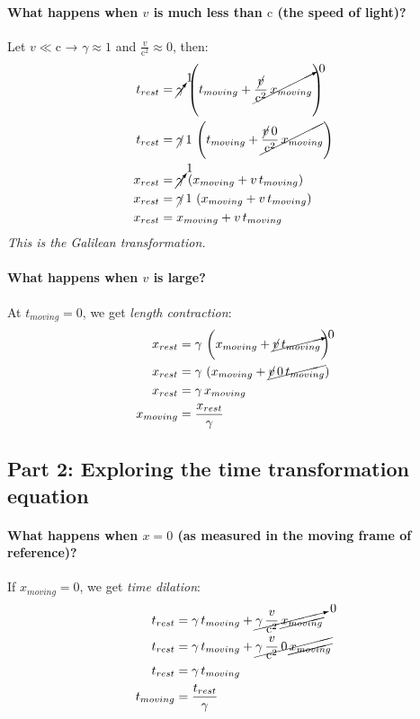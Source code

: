 \documentclass[pagesize,headsepline,10pt,parskip=half]{scrreprt}
\newcommand{\const}[1]{\ensuremath{\mathrm{#1}}}
\renewcommand{\c}{\const{c}}
\begin{document}
        \paragraph{What happens when $v$ is much less than \c{} (the speed of light)?}
          Let $v \ll \c$ → $\gamma \approx 1$ and $\frac{v}{\c^2} \approx 0$, then:
          \begin{align*}
            t_{rest} &= \cancelto{1}{\gamma} \, \left(t_{moving} + \cancelto{0}{\frac{\cancel{v}}{\c^2} \, x_{moving}}\right)\\
            t_{rest} &= \cancel{\gamma} \, 1 \, \left(t_{moving} + \cancel{\frac{\cancel{v} \, 0}{\c^2} \, x_{moving}}\right)\\
            x_{rest} &= \cancelto{1}{\gamma} \, \left(x_{moving} + v \, t_{moving}\right)\\
            x_{rest} &= \cancel{\gamma} \, 1 \, \left(x_{moving} + v \, t_{moving}\right)\\
            x_{rest} &= x_{moving} + v \, t_{moving}
          \end{align*}
          \emph{This is the Galilean transformation.}
        \paragraph{What happens when $v$ is large?}
          At $t_{moving} = 0$, we get \emph{length contraction}:
          \begin{align*}
            x_{rest} &= \gamma \, \left(x_{moving} + \cancelto{0}{\cancel{v} \, t_{moving}}\right)\\
            x_{rest} &= \gamma \, \left(x_{moving} + \cancel{\cancel{v} \, 0 \, t_{moving}}\right)\\
            x_{rest} &= \gamma \, x_{moving}\\
            x_{moving} &= \frac{x_{rest}}{\gamma}
          \end{align*}

      \subsection{Part 2: Exploring the time transformation equation}
        \paragraph{What happens when $x = 0$ (as measured in the moving frame of reference)?}
          If $x_{moving} = 0$, we get \emph{time dilation}:
          \begin{align*}
            t_{rest} &= \gamma \, t_{moving} + \cancelto{0}{\gamma \, \frac{v}{\c^2} \, \cancel{x_{moving}}}\\
            t_{rest} &= \gamma \, t_{moving} + \cancel{\gamma \, \frac{v}{\c^2} \, 0 \, \cancel{x_{moving}}}\\
            t_{rest} &= \gamma \, t_{moving}\\
            t_{moving} &= \frac{t_{rest}}{\gamma}
          \end{align*}
\end{document}
